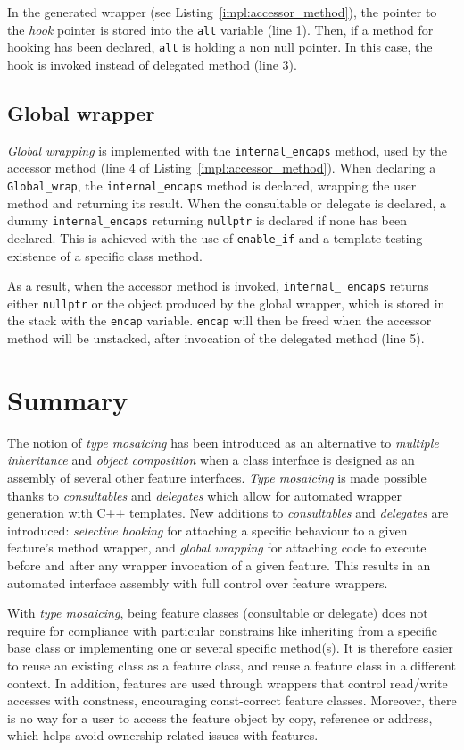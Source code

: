 \documentclass{article}
\begin{document}
In the generated wrapper (see Listing~\ref{impl:accessor_method}), the pointer to the \textit{hook} pointer is stored into the \texttt{alt} variable (line 1). Then, if a method for hooking has been declared, \texttt{alt} is holding a non null pointer. In this case, the hook is invoked instead of delegated method (line 3).    

\subsection{Global wrapper}
\textit{Global wrapping} is implemented with the \texttt{internal\_encaps} method, used by the accessor method (line 4 of Listing~\ref{impl:accessor_method}). When declaring a \texttt{Global\_wrap}, the \texttt{internal\_encaps} method is declared, wrapping the user method and returning its result. When the consultable or delegate is declared, a dummy \texttt{internal\_encaps} returning \texttt{nullptr} is declared if none has been declared. This is achieved with the use of \texttt{enable\_if} and a template testing existence of a specific class method.

As a result, when the accessor method is invoked, \texttt{internal\_ encaps} returns either \texttt{nullptr} or the object produced by the global wrapper, which is stored in the stack with the \texttt{encap} variable. \texttt{encap} will then be freed when the accessor method will be unstacked, after invocation of the delegated method (line 5).

\section{Summary}
The notion of \textit{type mosaicing} has been introduced as an alternative to \textit{multiple inheritance} and \textit{object composition} when a class interface is designed as an assembly of several other feature interfaces. \textit{Type mosaicing} is made possible thanks to \textit{consultables} and \textit{delegates} which allow for automated wrapper generation with C++ templates. New additions to \textit{consultables} and \textit{delegates} are introduced: \textit{selective hooking} for attaching a specific behaviour to a given feature's method wrapper, and \textit{global wrapping} for attaching code to execute before and after any wrapper invocation of a given feature. This results in an automated interface assembly with full control over feature wrappers.

With \textit{type mosaicing}, being feature classes (consultable or delegate) does not require for compliance with particular constrains like inheriting from a specific base class or implementing one or several specific method(s). It is therefore easier to reuse an existing class as a feature class, and reuse a feature class in a different context. In addition, features are used through wrappers that control read/write accesses with constness, encouraging const-correct feature classes. Moreover, there is no way for a user to access the feature object by copy, reference or address, which helps avoid ownership related issues with features.
\end{document}
